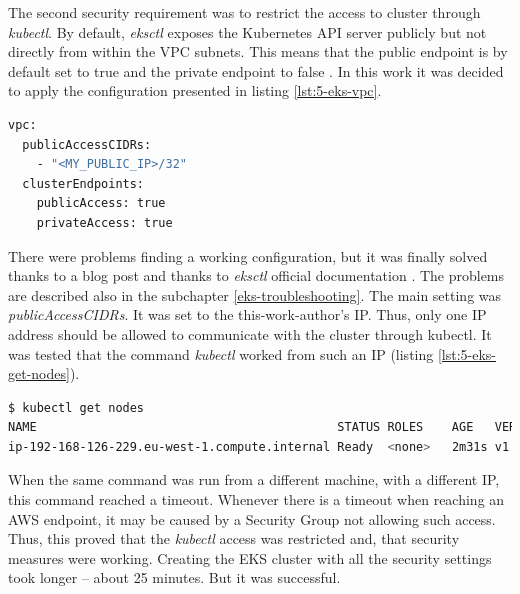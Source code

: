 The second security requirement was to restrict the access to cluster through \textit{kubectl}. By default, \textit{eksctl} exposes the Kubernetes API server publicly but not directly from within the VPC subnets. This means that the public endpoint is by default set to true and the private endpoint to false \cite{eksctl-net}. In this work it was decided to apply the configuration presented in listing \ref{lst:5-eks-vpc}.
\begin{lstlisting}[basicstyle=\scriptsize,xleftmargin=0cm,label=lst:5-eks-vpc,caption={\textit{Eksctl} configuration applying security measures},captionpos=b,language=Bash ]
vpc:
  publicAccessCIDRs:
    - "<MY_PUBLIC_IP>/32"
  clusterEndpoints:
    publicAccess: true
    privateAccess: true
\end{lstlisting}
There were problems finding a working configuration, but it was finally solved thanks to a blog post \cite{eksctl-net-issue-solution} and thanks to \textit{eksctl} official documentation \cite{eksctl-net}. The problems are described also in the subchapter \ref{eks-troubleshooting}. The main setting was \textit{publicAccessCIDRs}. It was set to the this-work-author's IP. Thus, only one IP address should be allowed to communicate with the cluster through kubectl. It was tested that the command \textit{kubectl} worked from such an IP (listing \ref{lst:5-eks-get-nodes}).
\begin{lstlisting}[basicstyle=\scriptsize,xleftmargin=0cm,label=lst:5-eks-get-nodes,caption={Verifying connection to API server},captionpos=b,language=Bash ]
$ kubectl get nodes
NAME                                          STATUS ROLES    AGE   VERSION
ip-192-168-126-229.eu-west-1.compute.internal Ready  <none>   2m31s v1.16.8-eks-e16311
\end{lstlisting}
When the same command was run from a different machine, with a different IP, this command reached a timeout. Whenever there is a timeout when reaching an AWS endpoint, it may be caused by a Security Group not allowing such access. Thus, this proved that the \textit{kubectl} access was restricted and, that security measures were working. Creating the EKS cluster with all the security settings took longer -- about 25 minutes. But it was successful.

